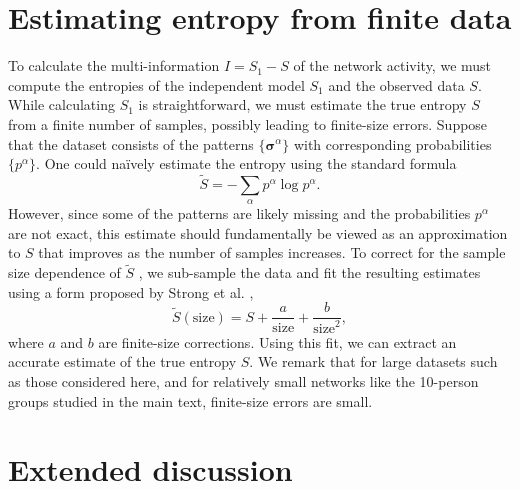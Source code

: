 \documentclass[aps,reprint,superscriptaddress,amsmath,amssymb,longbibliography]{revtex4-1}
\begin{document}
\section{Estimating entropy from finite data}

\label{Entropy}

To calculate the multi-information $I = S_1 - S$ of the network activity, we must compute the entropies of the independent model $S_1$ and the observed data $S$. While calculating $S_1$ is straightforward, we must estimate the true entropy $S$ from a finite number of samples, possibly leading to finite-size errors. Suppose that the dataset consists of the patterns $\{\bm{\sigma}^{\alpha}\}$ with corresponding probabilities $\{p^{\alpha}\}$. One could na\"{i}vely estimate the entropy using the standard formula
\begin{equation}
\tilde{S} = -\sum_{\alpha}p^{\alpha}\log p^{\alpha}.
\end{equation}
However, since some of the patterns are likely missing and the probabilities $p^{\alpha}$ are not exact, this estimate should fundamentally be viewed as an approximation to $S$ that improves as the number of samples increases. To correct for the sample size dependence of $\tilde{S}$ , we sub-sample the data and fit the resulting estimates using a form proposed by Strong et al. \cite{Strong-01},
\begin{equation}
\tilde{S}(\text{size}) = S + \frac{a}{\text{size}} + \frac{b}{\text{size}^2},
\end{equation}
where $a$ and $b$ are finite-size corrections. Using this fit, we can extract an accurate estimate of the true entropy $S$. We remark that for large datasets such as those considered here, and for relatively small networks like the 10-person groups studied in the main text, finite-size errors are small.

\section{Extended discussion}

\label{Discussion}
\end{document}

